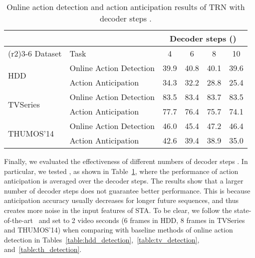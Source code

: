  \begin{table}[t]
    \centering
    \footnotesize
    \begin{tabular}
        {@{\;\;}l@{\;\;}@{\;\;}l@{\;\;}@{\;\;}c@{\;\;}@{\;\;}c@{\;\;}@{\;\;}c@{\;\;}@{\;\;}c@{\;\;}}
        \toprule
        & & \multicolumn{4}{c}{Decoder steps ()}\\
        \cmidrule(r{2\cmidrulekern}){3-6}
        Dataset & Task & 4 & 6 & 8 & 10 \\
        \midrule
        \multirow{2}{*}{HDD}
        & {Online Action Detection}   & 39.9 & 40.8 & 40.1 & 39.6 \\
        & {Action Anticipation}       & 34.3 & 32.2 & 28.8 & 25.4 \\
        \midrule
        \multirow{2}{*}{TVSeries}
        & {Online Action Detection}   & 83.5 & 83.4 & 83.7 & 83.5 \\
        & {Action Anticipation}       & 77.7 & 76.4 & 75.7 & 74.1 \\
        \midrule
        \multirow{2}{*}{THUMOS'14}
        & {Online Action Detection}   & 46.0 & 45.4 & 47.2 & 46.4 \\
        & {Action Anticipation}       & 42.6 & 39.4 & 38.9 & 35.0 \\
        \bottomrule

    \end{tabular}
    \vspace{-5pt}
    \caption{
        Online action detection and action anticipation results of TRN
        with decoder steps .
    }
    \vspace{-12pt}
    \label{table:decoder}
\end{table}

 

 Finally, we evaluated the
effectiveness of different numbers of decoder steps . In
particular, we tested , as shown in
Table~\ref{table:decoder}, where the performance of action
anticipation is averaged over the decoder steps. The results show that
a larger number of decoder steps does not guarantee better
performance. This is because anticipation accuracy usually
decreases for longer future sequences, and
thus creates more  noise in the input features of STA.  To be
clear, we follow the state-of-the-art~\cite{gao2017red} and set
 to 2 video seconds (6 frames in HDD,  8 frames in
TVSeries and THUMOS'14) when comparing
with baseline methods of online action detection in
Tables~\ref{table:hdd_detection},~\ref{table:tv_detection},
and~\ref{table:th_detection}.

